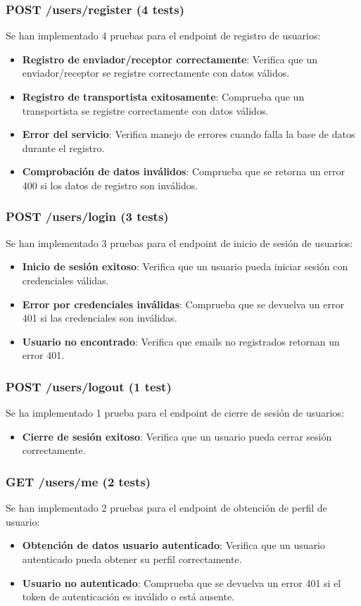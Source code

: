 \subsubsection{POST /users/register (4 tests)}
Se han implementado 4 pruebas para el endpoint de registro de usuarios:
\begin{itemize}
    \item \textbf{Registro de enviador/receptor correctamente}: Verifica que un enviador/receptor se registre correctamente con datos válidos.
    \item \textbf{Registro de transportista exitosamente}: Comprueba que un transportista se registre correctamente con datos válidos.
    \item \textbf{Error del servicio}: Verifica manejo de errores cuando falla la base de datos durante el registro.
    \item \textbf{Comprobación de datos inválidos}: Comprueba que se retorna un error 400 si los datos de registro son inválidos.
\end{itemize}

\subsubsection{POST /users/login (3 tests)}
Se han implementado 3 pruebas para el endpoint de inicio de sesión de usuarios:
\begin{itemize}
    \item \textbf{Inicio de sesión exitoso}: Verifica que un usuario pueda iniciar sesión con credenciales válidas.
    \item \textbf{Error por credenciales inválidas}: Comprueba que se devuelva un error 401 si las credenciales son inválidas.
    \item \textbf{Usuario no encontrado}: Verifica que emails no registrados retornan un error 401.
\end{itemize}

\subsubsection{POST /users/logout (1 test)}
Se ha implementado 1 prueba para el endpoint de cierre de sesión de usuarios:
\begin{itemize}
    \item \textbf{Cierre de sesión exitoso}: Verifica que un usuario pueda cerrar sesión correctamente.
\end{itemize}

\subsubsection{GET /users/me (2 tests)}
Se han implementado 2 pruebas para el endpoint de obtención de perfil de usuario:
\begin{itemize}
    \item \textbf{Obtención de datos usuario autenticado}: Verifica que un usuario autenticado pueda obtener su perfil correctamente.
    \item \textbf{Usuario no autenticado}: Comprueba que se devuelva un error 401 si el token de autenticación es inválido o está ausente.
\end{itemize}

